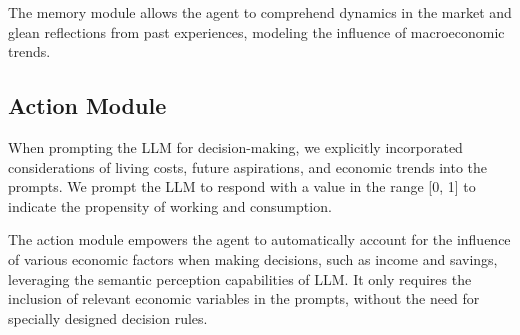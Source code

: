 The memory module allows the agent to comprehend dynamics in the market and glean reflections from past experiences, modeling the influence of macroeconomic trends.

\subsection{Action Module}
When prompting the LLM for decision-making, we explicitly incorporated considerations of living costs, future aspirations, and economic trends into the prompts. We prompt the LLM to respond with a value in the range [0, 1] to indicate the propensity of working and consumption. 

The action module empowers the agent to automatically account for the influence of various economic factors when making decisions, such as income and savings, leveraging the semantic perception capabilities of LLM. It only requires the inclusion of relevant economic variables in the prompts, without the need for specially designed decision rules.
